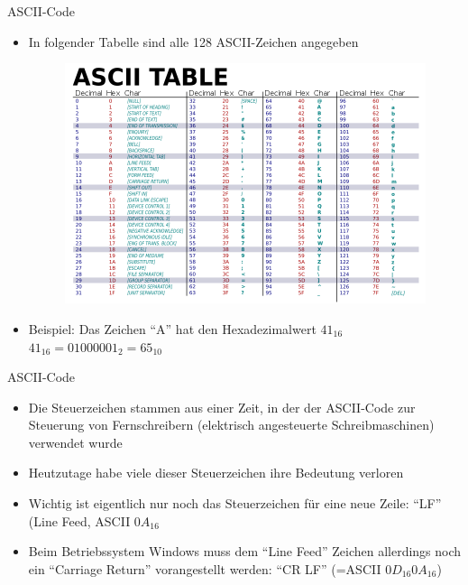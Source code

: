 \documentclass[12pt%
,xcolor=table
,aspectratio=169%
]{beamer}
\begin{document}
\begin{frame}{ASCII-Code}
\begin{itemize}
	\item In folgender Tabelle sind alle 128 ASCII-Zeichen angegeben
	\begin{figure}
	\center
	\includegraphics[scale=0.3]{pictures/ascii}
	\end{figure}
	\item Beispiel: Das Zeichen \enquote{A} hat den Hexadezimalwert $41_{16}$ $41_{16} = 01000001_2 = 65_{10}$
\end{itemize}
\end{frame}

\begin{frame}{ASCII-Code}
\begin{itemize}
	\item Die Steuerzeichen stammen aus einer Zeit, in der der ASCII-Code zur Steuerung von Fernschreibern (elektrisch angesteuerte Schreibmaschinen) verwendet wurde
	\item Heutzutage habe viele dieser Steuerzeichen ihre Bedeutung verloren
	\item Wichtig ist eigentlich nur noch das Steuerzeichen für eine neue Zeile: \enquote{LF} (Line Feed, ASCII $0A_{16}$
	\item Beim Betriebssystem Windows muss dem \enquote{Line Feed} Zeichen allerdings noch ein \enquote{Carriage Return} vorangestellt werden: \enquote{CR LF} (=ASCII $0D_{16} 0A_{16}$)
\end{itemize}
\end{frame}
\end{document}
